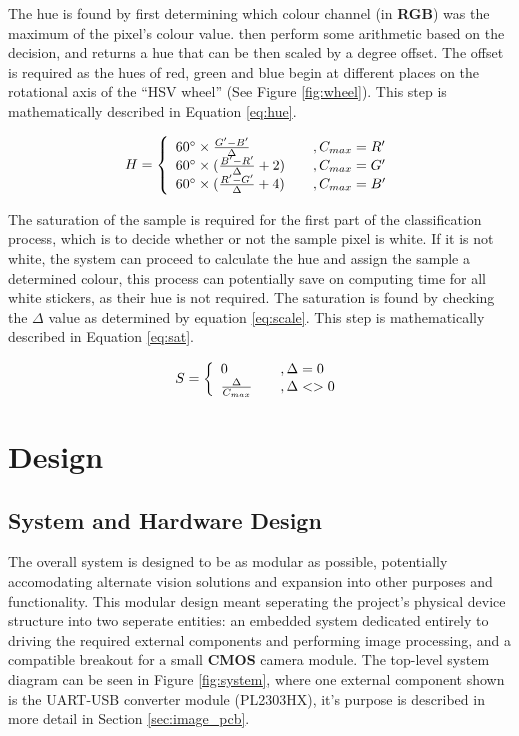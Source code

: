 \documentclass[11pt, a4paper, oneside]{Thesis} %
\begin{document}
The hue is found by first determining which colour channel (in \textbf{RGB}) was the maximum of the pixel's colour value. then perform some arithmetic based on the decision, and returns a hue that can be then scaled by a degree offset. The offset is required as the hues of red, green and blue begin at different places on the rotational axis of the ``HSV wheel'' (See Figure \ref{fig:wheel}). This step is mathematically described in Equation \ref{eq:hue}.

\begin{equation}\label{eq:hue}
H = \left\{
\begin{array}{l l}
  60^{\circ} \times \frac{G'-B'}{\Delta} & \quad ,C_{max} = R'\\
  60^{\circ} \times (\frac{B'-R'}{\Delta}+2) & \quad ,C_{max} = G'\\
  60^{\circ} \times (\frac{R'-G'}{\Delta}+4) & \quad ,C_{max} = B'
\end{array} \right.
\end{equation}

The saturation of the sample is required for the first part of the classification process, which is to decide whether or not the sample pixel is white. If it is not white, the system can proceed to calculate the hue and assign the sample a determined colour, this process can potentially save on computing time for all white stickers, as their hue is not required. The saturation is found by checking the $\Delta$ value as determined by equation \ref{eq:scale}. This step is mathematically described in Equation \ref{eq:sat}.

\begin{equation}\label{eq:sat}
S = \left\{
\begin{array}{l l}
  0 & \quad ,\Delta = 0\\
  \frac{\Delta}{C_{max}} & \quad ,\Delta <> 0
\end{array} \right.
\end{equation}


\chapter{Design}
\label{chap:design} %

\section{System and Hardware Design}\label{sec:hardware}
The overall system is designed to be as modular as possible, potentially accomodating alternate vision solutions and expansion into other purposes and functionality. This modular design meant seperating the project's physical device structure into two seperate entities: an embedded system dedicated entirely to driving the required external components and performing image processing, and a compatible breakout for a small \textbf{CMOS} camera module. The top-level system diagram can be seen in Figure \ref{fig:system}, where one external component shown is the UART-USB converter module (PL2303HX), it's purpose is described in more detail in Section \ref{sec:image_pcb}.
\end{document}
